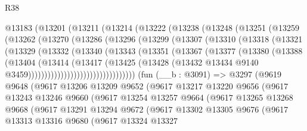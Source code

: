 \begin{lexlean}{R38}
\begin{coremodule}
    @13183
      (@13201
        (@13211
          (@13214
            (@13222
              (@13238
                (@13248
                  (@13251
                    (@13259
                      (@13262
                        (@13270
                          (@13286
                            (@13296
                              (@13299
                                (@13307
                                  (@13310
                                    (@13318
                                      (@13321
                                        (@13329
                                          (@13332
                                            (@13340
                                              (@13343
                                                (@13351
                                                  (@13367
                                                    (@13377
                                                      (@13380
                                                        (@13388
                                                          (@13404
                                                            (@13414
                                                              (@13417
                                                                (@13425
                                                                  (@13428
                                                                    (@13432
                                                                      @13434
                                                                      @9140
                                                                      @3459)))))))))))))))))))))))))))))))))
    (fun (__b : @3091) =>
    @3297
      (@9619
        @9648
        (@9617
          @13206
          @13209
          @9652
          (@9617
            @13217
            @13220
            @9656
            (@9617
              @13243
              @13246
              @9660
              (@9617
                @13254
                @13257
                @9664
                (@9617
                  @13265
                  @13268
                  @9668
                  (@9617
                    @13291
                    @13294
                    @9672
                    (@9617
                      @13302
                      @13305
                      @9676
                      (@9617
                        @13313
                        @13316
                        @9680
                        (@9617
                          @13324
                          @13327

\end{coremodule}
\end{lexlean}
